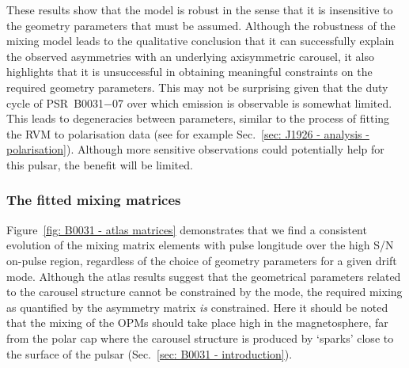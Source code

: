 These results show that the model is robust in the sense that it is insensitive to the geometry parameters that must be assumed. Although the robustness of the mixing model leads to the qualitative conclusion that it can successfully explain the observed asymmetries with an underlying axisymmetric carousel, it also highlights that it is unsuccessful in obtaining meaningful constraints on the required geometry parameters. This may not be surprising given that the duty cycle of PSR~B0031$-$07 over which emission is observable is somewhat limited. This leads to degeneracies between parameters, similar to the process of fitting the RVM to polarisation data (see for example Sec.~\ref{sec: J1926 - analysis - polarisation}). Although more sensitive observations could potentially help for this pulsar, the benefit will be limited.



\subsubsection{The fitted mixing matrices}
\label{sec: B0031 - discuss - atlas - mixing matrix}

Figure~\ref{fig: B0031 - atlas matrices} demonstrates that we find a consistent evolution of the mixing matrix elements with pulse longitude over the high S/N on-pulse region, regardless of the choice of geometry parameters for a given drift mode. Although the atlas results suggest that the geometrical parameters related to the carousel structure cannot be constrained by the mode, the required mixing as quantified by the asymmetry matrix \textit{is} constrained. Here it should be noted that the mixing of the OPMs should take place high in the magnetosphere, far from the polar cap where the carousel structure is produced by `sparks' close to the surface of the pulsar (Sec.~\ref{sec: B0031 - introduction}).


